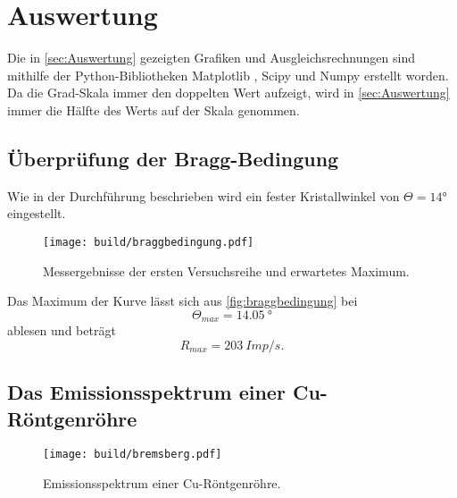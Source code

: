 \newpage
\section{Auswertung}
\label{sec:Auswertung}

Die in \autoref{sec:Auswertung} gezeigten Grafiken und Ausgleichsrechnungen sind mithilfe der Python-Bibliotheken Matplotlib \cite{matplotlib}, Scipy \cite{scipy} und Numpy \cite{numpy}
erstellt worden.
Da die Grad-Skala immer den doppelten Wert aufzeigt, wird in \autoref{sec:Auswertung} immer
die Hälfte des Werts auf der Skala genommen.
\subsection{Überprüfung der Bragg-Bedingung}

Wie in der Durchführung beschrieben wird ein fester Kristallwinkel von $\Theta = 14°$
eingestellt. 
\begin{figure}[H]
  \texttt{[image: build/braggbedingung.pdf]}
  \caption{Messergebnisse der ersten Versuchsreihe und erwartetes Maximum.}
  \label{fig:braggbedingung}
\end{figure}
Das Maximum der Kurve lässt sich aus \autoref{fig:braggbedingung} bei
\begin{equation*}
  \Theta_{max} = \SI{14.05}{°}
\end{equation*}
ablesen und beträgt
\begin{equation*}
  R_{max} = \SI{203}{Imp/s}.
\end{equation*}

\subsection{Das Emissionsspektrum einer Cu-Röntgenröhre}
\begin{figure}[H]
  \texttt{[image: build/bremsberg.pdf]}
  \caption{Emissionsspektrum einer Cu-Röntgenröhre.}
  \label{fig:spektrum}
\end{figure}

